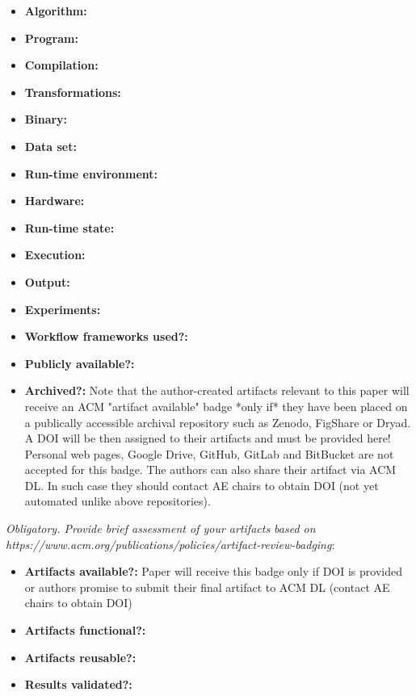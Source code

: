 \documentclass{sigplanconf}
\begin{document}
{\small
\begin{itemize}
  \item {\bf Algorithm: }
  \item {\bf Program: }
  \item {\bf Compilation: }
  \item {\bf Transformations: }
  \item {\bf Binary: }
  \item {\bf Data set: }
  \item {\bf Run-time environment: }
  \item {\bf Hardware: }
  \item {\bf Run-time state: }
  \item {\bf Execution: }
  \item {\bf Output: }
  \item {\bf Experiments: }
  \item {\bf Workflow frameworks used?: }
  \item {\bf Publicly available?: } 
  \item {\bf Archived?: } 
        Note that the author-created artifacts relevant to this paper 
        will receive an ACM "artifact available" badge *only if* 
        they have been placed on a publically 
        accessible archival repository such as Zenodo, FigShare or Dryad.
        A DOI will be then assigned to their artifacts and must be provided here!  
        Personal web pages, Google Drive, GitHub, GitLab and BitBucket 
        are not accepted for this badge.
        The authors can also share their artifact via ACM DL. 
        In such case they should contact AE chairs to obtain DOI 
        (not yet automated unlike above repositories). 

\end{itemize}

{\em Obligatory. Provide brief assessment of your artifacts 
based on {\em https://www.acm.org/publications/policies/artifact-review-badging}}:

\begin{itemize}
  \item {\bf Artifacts available?:} Paper will receive this badge 
                                    only if DOI is provided or authors promise 
                                    to submit their final artifact to ACM DL
                                    (contact AE chairs to obtain DOI)
  \item {\bf Artifacts functional?:}
  \item {\bf Artifacts reusable?:}
  \item {\bf Results validated?:}
\end{itemize}

}
\end{document}
